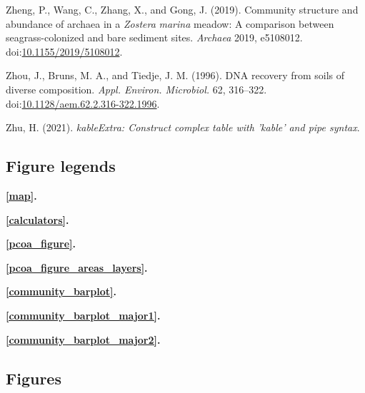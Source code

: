 \documentclass[12pt,]{article}
\begin{document}
\leavevmode\hypertarget{ref-Zheng2019}{}%
Zheng, P., Wang, C., Zhang, X., and Gong, J. (2019). Community structure
and abundance of archaea in a \emph{} \emph{Zostera} \emph{marina}
meadow: A comparison between seagrass-colonized and bare sediment sites.
\emph{Archaea} 2019, e5108012.
doi:\href{https://doi.org/10.1155/2019/5108012}{10.1155/2019/5108012}.

\leavevmode\hypertarget{ref-Zhou1996b}{}%
Zhou, J., Bruns, M. A., and Tiedje, J. M. (1996). DNA recovery from
soils of diverse composition. \emph{Appl. Environ. Microbiol.} 62,
316--322.
doi:\href{https://doi.org/10.1128/aem.62.2.316-322.1996}{10.1128/aem.62.2.316-322.1996}.

\leavevmode\hypertarget{ref-Zhu2021}{}%
Zhu, H. (2021). \emph{kableExtra: Construct complex table with 'kable'
and pipe syntax}.

\newpage 
\setlength\parindent{0pt}

\hypertarget{figure-legends}{%
\subsection{Figure legends}\label{figure-legends}}

\textbf{\autoref{map}.} 

\textbf{\autoref{calculators}.} 

\textbf{\autoref{pcoa_figure}.} 

\textbf{\autoref{pcoa_figure_areas_layers}.}

\textbf{\autoref{community_barplot}.} 

\textbf{\autoref{community_barplot_major1}.}

\textbf{\autoref{community_barplot_major2}.}

\newpage

\hypertarget{figures}{%
\subsection{Figures}\label{figures}}
\end{document}
